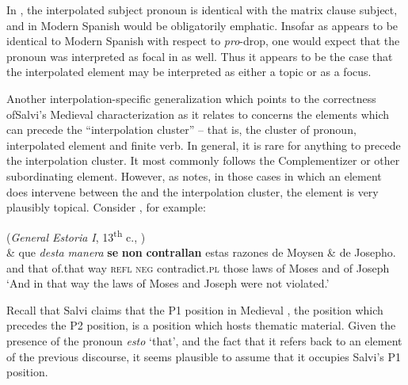 \documentclass[output=paper]{LSP/langsci}
\begin{document}
\noindent In , the interpolated subject pronoun is identical with the matrix clause subject, and in Modern Spanish would be obligatorily emphatic.  Insofar as  appears to be identical to Modern Spanish with respect to \textit{pro}-drop, one would expect that the pronoun was interpreted as focal in  as well.  Thus it appears to be the case that the interpolated element may be interpreted as either a topic or as a focus.

Another interpolation-specific generalization which points to the correctness of\linebreak Salvi's Medieval  characterization as it relates to  concerns the elements which can precede the ``interpolation cluster'' -- that is, the cluster of  pronoun, interpolated element and finite verb.  In general, it is rare for anything to precede the interpolation cluster.  It most commonly follows the Complementizer or other subordinating element.  However, as \citet{Poole2013} notes, in those cases in which an element does intervene between the  and the interpolation cluster, the element is very plausibly topical. Consider , for example:

\ea%
    \label{ex:poole:9}(\textit{General Estoria I}, 13\textsuperscript{th} c., \citealt[(35)]{Poole2013})\\
    \gll      \& que \textit{desta} \textit{manera} \textbf{se} \textbf{non} \textbf{contrallan} estas razones de Moysen \& de Josepho.\\
	and that of.that way \textsc{refl} \textsc{neg} contradict.\textsc{pl} those laws of Moses and of Joseph\\
    \glt‘And in that way the laws of Moses and Joseph were not violated.’
    \z

\noindent Recall that Salvi claims that the P1 position in Medieval , the position which precedes the P2 position, is a position which hosts thematic material.  Given the presence of the  pronoun \textit{esto} ‘that’, and the fact that it refers back to an element of the previous discourse, it seems plausible to assume that it occupies Salvi’s P1 position.  
\end{document}
